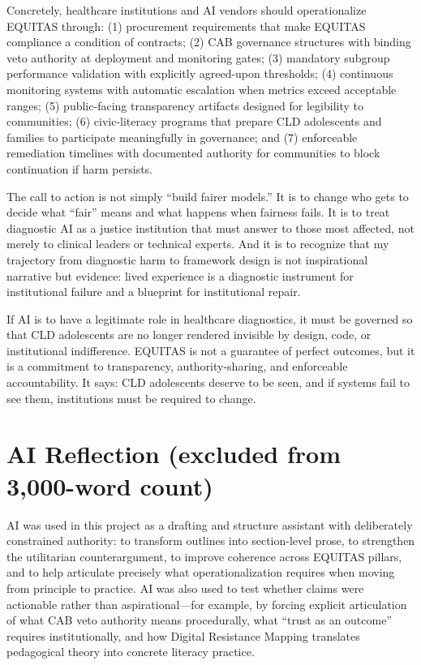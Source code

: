 \documentclass[12pt,letterpaper]{article}
\begin{document}
Concretely, healthcare institutions and AI vendors should operationalize EQUITAS through: (1) procurement requirements that make EQUITAS compliance a condition of contracts; (2) CAB governance structures with binding veto authority at deployment and monitoring gates; (3) mandatory subgroup performance validation with explicitly agreed-upon thresholds; (4) continuous monitoring systems with automatic escalation when metrics exceed acceptable ranges; (5) public-facing transparency artifacts designed for legibility to communities; (6) civic-literacy programs that prepare CLD adolescents and families to participate meaningfully in governance; and (7) enforceable remediation timelines with documented authority for communities to block continuation if harm persists.\cite{garcia_ed415}

The call to action is not simply ``build fairer models.'' It is to change who gets to decide what ``fair'' means and what happens when fairness fails. It is to treat diagnostic AI as a justice institution that must answer to those most affected, not merely to clinical leaders or technical experts. And it is to recognize that my trajectory from diagnostic harm to framework design is not inspirational narrative but evidence: lived experience is a diagnostic instrument for institutional failure and a blueprint for institutional repair.\cite{garcia_ed415}

If AI is to have a legitimate role in healthcare diagnostics, it must be governed so that CLD adolescents are no longer rendered invisible by design, code, or institutional indifference. EQUITAS is not a guarantee of perfect outcomes, but it is a commitment to transparency, authority-sharing, and enforceable accountability. It says: CLD adolescents deserve to be seen, and if systems fail to see them, institutions must be required to change.\cite{garcia_ed415}

\section*{AI Reflection (excluded from 3,000-word count)}

AI was used in this project as a drafting and structure assistant with deliberately constrained authority: to transform outlines into section-level prose, to strengthen the utilitarian counterargument, to improve coherence across EQUITAS pillars, and to help articulate precisely what operationalization requires when moving from principle to practice. AI was also used to test whether claims were actionable rather than aspirational---for example, by forcing explicit articulation of what CAB veto authority means procedurally, what ``trust as an outcome'' requires institutionally, and how Digital Resistance Mapping translates pedagogical theory into concrete literacy practice.\cite{garcia_ed415}
\end{document}
